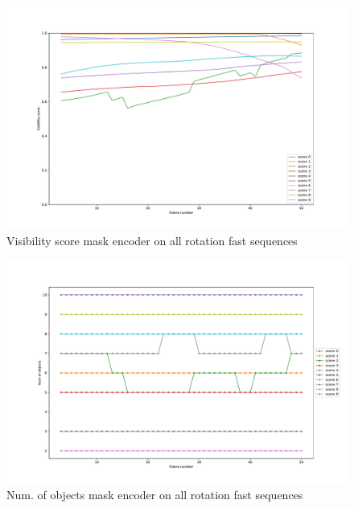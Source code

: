 \begin{figure} [ht!]
    \centering
    \includegraphics[trim={ 0 2cm 0 2.5cm},width=0.6\linewidth]{figures/appendix/6_mask_att_fpn_fast_rotation-visibility.pdf}
    \caption{Visibility score mask encoder on all rotation fast sequences}
    \label{fig:mask_visibility}
    
\end{figure}
\begin{figure} [ht!]
    \centering
    \includegraphics[trim={ 0 2cm 0 2.5cm},width=0.6\linewidth]{figures/appendix/6_mask_att_fpn_fast_rotation-crowdness.pdf}
    \caption{Num. of objects mask encoder on all rotation fast sequences}
    \label{fig:mask_crowdness}
    
\end{figure}
